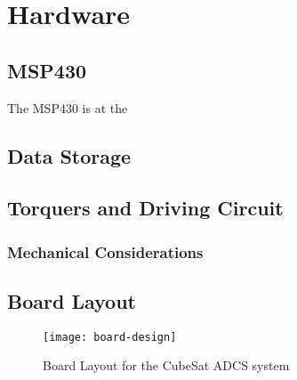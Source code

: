 
\chapter{Hardware}

\label{ch:Hardware}

\section{MSP430}

The MSP430 is at the 

\section{Data Storage}

\section{Torquers and Driving Circuit}

\subsection{Mechanical Considerations}

\section{Board Layout}

\begin{figure}[H]
    \centering
    \texttt{[image: board-design]}
    \caption{Board Layout for the CubeSat \acs{ADCS} system}
\end{figure}

\begin{comment}

\section{Board Renderings}

\begin{figure}[H]
    \centering
    \texttt{[image: board-drawing]}
    \caption{3D view of the CubeSat \acs{ADCS} system}
\end{figure}

\begin{figure}[H]
    \centering
    \texttt{[image: board-drawing-with-standoffs]}
    \caption{3D view of the CubeSat \acs{ADCS} system with Z-axis torquers}
\end{figure}

\end{comment}
